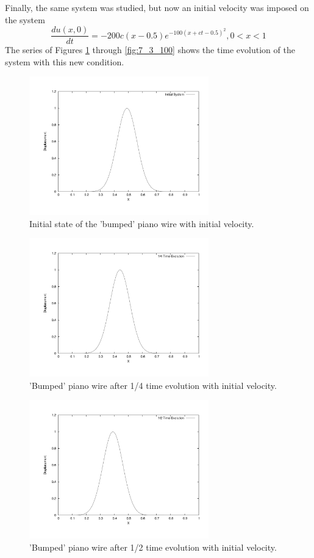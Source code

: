 \documentclass[12pt]{article}
\begin{document}
Finally, the same system was studied, but now an initial velocity was imposed on the system
\begin{equation}
\label{gaussVel}
\frac{du(x,0)}{dt}=-200c(x-0.5) e^{-100(x+ct-0.5)^2} , 0<x<1
\end{equation}
The series of Figures \ref{fig:7_3_0} through \ref{fig:7_3_100} shows the time evolution of the system with this new condition.
\begin{figure}[!h]
\centering
\includegraphics[width =110 mm, height = 60mm]{Ex_7_3_0.pdf}
\caption{Initial state of the 'bumped' piano wire with initial velocity.}
\label{fig:7_3_0}
\end{figure}
\begin{figure}[!h]
\centering
\includegraphics[width =110 mm, height = 60mm]{Ex_7_3_25.pdf}
\caption{'Bumped' piano wire after 1/4 time evolution with initial velocity.}
\label{fig:7_3_25}
\end{figure}
\begin{figure}[!h]
\centering
\includegraphics[width =110 mm, height = 60mm]{Ex_7_3_50.pdf}
\caption{'Bumped' piano wire after 1/2 time evolution with initial velocity.}
\label{fig:7_3_50}
\end{figure}
\end{document}

